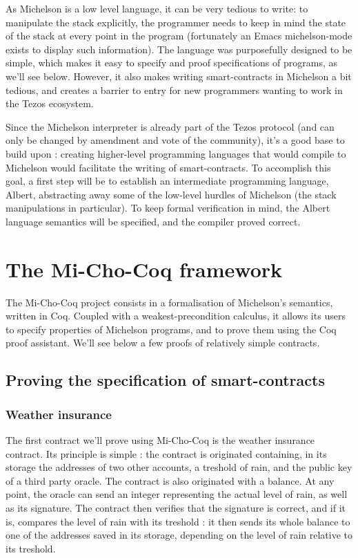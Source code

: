 \documentclass{report}
\begin{document}
As Michelson is a low level language, it can be very tedious to write: to manipulate the stack explicitly, the programmer needs to keep in mind the state of the stack at every point in the program (fortunately an Emacs michelson-mode exists to display such information). The language was purposefully designed to be simple, which makes it easy to specify and proof specifications of programs, as we'll see below. However, it also makes writing smart-contracts in Michelson a bit tedious, and creates a barrier to entry for new programmers wanting to work in the Tezos ecosystem.

Since the Michelson interpreter is already part of the Tezos protocol (and can only be changed by amendment and vote of the community), it's a good base to build upon : creating higher-level programming languages that would compile to Michelson would facilitate the writing of smart-contracts. To accomplish this goal, a first step will be to establish an intermediate programming language, Albert, abstracting away some of the low-level hurdles of Michelson (the stack manipulations in particular). To keep formal verification in mind, the Albert language semantics will be specified, and the compiler proved correct.

\chapter{The Mi-Cho-Coq framework}

The Mi-Cho-Coq project consists in a formalisation of Michelson's semantics, written in Coq. Coupled with a weakest-precondition calculus, it allows its users to specify properties of Michelson programs, and to prove them using the Coq proof assistant. We'll see below a few proofs of relatively simple contracts.

\section{Proving the specification of smart-contracts}

\subsection{Weather insurance}
\label{contractsSpec}

The first contract we'll prove using Mi-Cho-Coq is the weather insurance contract. Its principle is simple : the contract is originated containing, in its storage the addresses of two other accounts, a treshold of rain, and the public key of a third party oracle. The contract is also originated with a balance. At any point, the oracle can send an integer representing the actual level of rain, as well as its signature. The contract then verifies that the signature is correct, and if it is, compares the level of rain with its treshold : it then sends its whole balance to one of the addresses saved in its storage, depending on the level of rain relative to its treshold.
\end{document}

